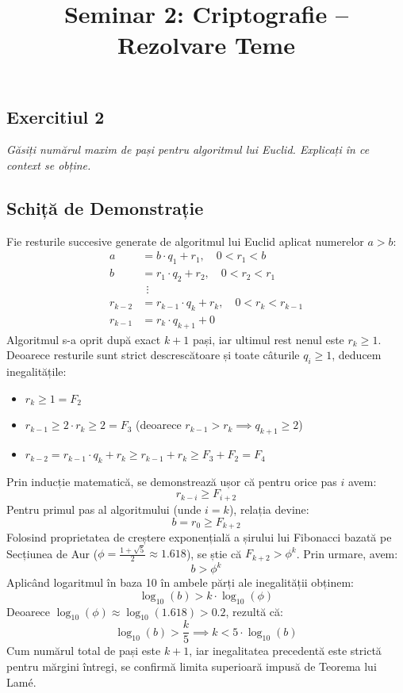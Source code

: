 \documentclass[12pt]{article}
\title{Seminar 2: Criptografie -- Rezolvare Teme}
\author{}
\date{} %
\begin{document}
\maketitle


\subsection*{Exercitiul 2}
\textit{Găsiți numărul maxim de pași pentru algoritmul lui Euclid. Explicați în ce context se obține.} 


\subsection{Schiță de Demonstrație}
Fie resturile succesive generate de algoritmul lui Euclid aplicat numerelor $a > b$:
\begin{align*}
a &= b \cdot q_1 + r_1, \quad 0 < r_1 < b \\
b &= r_1 \cdot q_2 + r_2, \quad 0 < r_2 < r_1 \\
  &\ \ \vdots \\
r_{k-2} &= r_{k-1} \cdot q_k + r_k, \quad 0 < r_k < r_{k-1} \\
r_{k-1} &= r_k \cdot q_{k+1} + 0
\end{align*}
Algoritmul s-a oprit după exact $k+1$ pași, iar ultimul rest nenul este $r_k \ge 1$. Deoarece resturile sunt strict descrescătoare și toate câturile $q_i \ge 1$, deducem inegalitățile:
\begin{itemize}
    \item $r_k \ge 1 = F_2$
    \item $r_{k-1} \ge 2 \cdot r_k \ge 2 = F_3$ (deoarece $r_{k-1} > r_k \implies q_{k+1} \ge 2$)
    \item $r_{k-2} = r_{k-1} \cdot q_k + r_k \ge r_{k-1} + r_k \ge F_3 + F_2 = F_4$
\end{itemize}

Prin inducție matematică, se demonstrează ușor că pentru orice pas $i$ avem:
\[
r_{k-i} \ge F_{i+2}
\]
Pentru primul pas al algoritmului (unde $i = k$), relația devine:
\[
b = r_0 \ge F_{k+2}
\]
Folosind proprietatea de creștere exponențială a șirului lui Fibonacci bazată pe Secțiunea de Aur ($\phi = \frac{1+\sqrt{5}}{2} \approx 1.618$), se știe că $F_{k+2} > \phi^k$. Prin urmare, avem:
\[
b > \phi^k
\]
Aplicând logaritmul în baza 10 în ambele părți ale inegalității obținem:
\[
\log_{10}(b) > k \cdot \log_{10}(\phi)
\]
Deoarece $\log_{10}(\phi) \approx \log_{10}(1.618) > 0.2$, rezultă că:
\[
\log_{10}(b) > \frac{k}{5} \implies k < 5 \cdot \log_{10}(b)
\]
Cum numărul total de pași este $k+1$, iar inegalitatea precedentă este strictă pentru mărgini întregi, se confirmă limita superioară impusă de Teorema lui Lamé.
\end{document}
